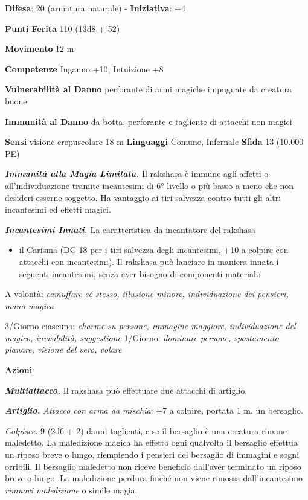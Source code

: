 \begin{multicols}{2}
\textbf{Difesa}: 20 (armatura naturale) - \textbf{Iniziativa}: +4

\textbf{Punti Ferita} 110 (13d8 + 52)

\textbf{Movimento} 12 m

\textbf{Competenze} Inganno +10, Intuizione +8

\textbf{Vulnerabilità al Danno} perforante di armi magiche impugnate da
creatura buone

\textbf{Immunità al Danno} da botta, perforante e tagliente di
attacchi non magici

\textbf{Sensi} visione crepuscolare 18 m
\textbf{Linguaggi} Comune, Infernale \textbf{Sfida} 13 (10.000 PE)\smallskip

\emph{\textbf{Immunità alla Magia Limitata.}} Il rakshasa è immune agli
affetti o all'individuazione tramite incantesimi di 6° livello o più
basso a meno che non desideri esserne soggetto. Ha vantaggio ai tiri
salvezza contro tutti gli altri incantesimi ed effetti magici.

\emph{\textbf{Incantesimi Innati.}} La caratteristica da incantatore del
rakshasa


\begin{itemize}
\item
  il Carisma (DC 18 per i tiri salvezza degli incantesimi, +10 a colpire
  con attacchi con incantesimi). Il rakshasa può lanciare in maniera
  innata i seguenti incantesimi, senza aver bisogno di componenti
  materiali:
\end{itemize}


A volontà: \emph{camuffare sé stesso, illusione minore, individuazione}
\emph{dei pensieri, mano magica}

3/Giorno ciascuno: \emph{charme su persone, immagine maggiore,}
\emph{individuazione del magico, invisibilità, suggestione} 1/Giorno:
\emph{dominare persone, spostamento planare, visione del} \emph{vero,
volare}

\smallskip\textbf{Azioni}

\emph{\textbf{Multiattacco.}} Il rakshasa può effettuare due attacchi di
artiglio.

\emph{\textbf{Artiglio.} Attacco con arma da mischia}: +7 a colpire,
portata 1 m, un bersaglio.

\emph{Colpisce:} 9 (2d6 + 2) danni taglienti, e se il bersaglio è una
creatura rimane maledetto. La maledizione magica ha effetto ogni
qualvolta il bersaglio effettua un riposo breve o lungo, riempiendo i
pensieri del bersaglio di immagini e sogni orribili. Il bersaglio
maledetto non riceve beneficio dall'aver terminato un riposo breve o
lungo. La maledizione perdura finché non viene rimossa dall'incantesimo
\emph{rimuovi maledizione} o simile magia.




\end{multicols}
